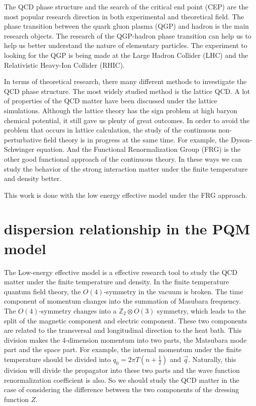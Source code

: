 \documentclass[%
reprint,
superscriptaddress,
showpacs,preprintnumbers,
 amsmath,amssymb,
 aps,
prd,
]{revtex4-1}
\begin{document}
The QCD phase structure and the search of the critical end point (CEP) are the most popular research direction in both experimental and 
theoretical field. The phase transition between the quark gluon plasma (QGP) and hadron is the main research objects. The research of the
QGP-hadron phase transition can help us to help us better understand the nature of elementary particles. The experiment to looking for the 
QGP is being made at the Large Hadron Collider (LHC) and the Relativistic Heavy-Ion Collider (RHIC).\par
In terms of theoretical research, there many different methods to investigate the QCD phase structure. The most widely studied method is 
the lattice QCD. A lot of properties of the QCD matter have been discussed under the lattice simulations. Although the lattice theory has the
sign problem at high baryon chemical potential, it still gave us plenty of great outcomes. In order to avoid the problem that occurs in lattice 
calculation, the study of the continuous non-perturbative field theory is in progress at the same time. For example, the Dyson-Schwinger 
equation. And the Functional Renormalization Group (FRG) is the other good functional approach of the continuous theory. In these ways 
we can study the behavior of the strong interaction matter under the finite temperature and density better.\par
This work is done with the low energy effective model under the FRG approach. 



\section{dispersion relationship in the PQM model}
The Low-energy effective model is a effective research tool to study the QCD matter under the finite temperature and density. In the 
finite temperature quantum field theory, the $O(4)$-symmetry in the vacuum is broken. The time component of momentum changes into the 
summation of Masubara frequency. The $O(4)$-symmetry changes into a 
$\mathbb{Z}_2\otimes O(3)$ symmetry, which leads to the split of the magnetic component and electric component. These two 
components are related to the transversal and longitudinal direction to the heat bath. This division makes the 4-dimension momentum
into two parts, the Matsubara mode part and the space part. For example, the internal momentum under the finite temperature should 
be divided into $q_0=2\pi T(n+\frac{1}{2})$ and $\vec{q}$. Naturally, this division will divide the propagator into these two parts and 
the wave function renormalization coefficient is also. So we should study the QCD matter in the case of considering the difference 
between the two components of the dressing function $Z$. \par
\end{document}

